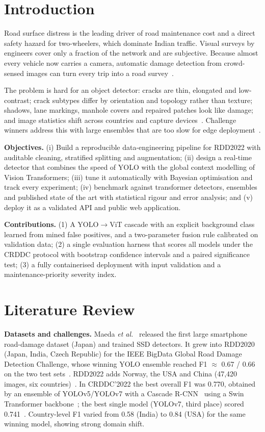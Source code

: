 \IfFileExists{IEEEtran.cls}{\documentclass[conference]{IEEEtran}}%
\begin{document}
\section{Introduction}
Road surface distress is the leading driver of road maintenance cost and a direct safety hazard for two-wheelers, which dominate Indian traffic. Visual surveys by engineers cover only a fraction of the network and are subjective. Because almost every vehicle now carries a camera, automatic damage detection from crowd-sensed images can turn every trip into a road survey~\cite{maeda2018,arya2021}.

The problem is hard for an object detector: cracks are thin, elongated and low-contrast; crack subtypes differ by orientation and topology rather than texture; shadows, lane markings, manhole covers and repaired patches look like damage; and image statistics shift across countries and capture devices~\cite{rdd2022}. Challenge winners address this with large ensembles that are too slow for edge deployment~\cite{crddc2022,grddc2020}.

\textbf{Objectives.} (i) Build a reproducible data-engineering pipeline for RDD2022 with auditable cleaning, stratified splitting and augmentation; (ii) design a real-time detector that combines the speed of YOLO with the global context modelling of Vision Transformers; (iii) tune it automatically with Bayesian optimisation and track every experiment; (iv) benchmark against transformer detectors, ensembles and published state of the art with statistical rigour and error analysis; and (v) deploy it as a validated API and public web application.

\textbf{Contributions.} (1) A YOLO$\rightarrow$ViT cascade with an explicit background class learned from mined false positives, and a two-parameter fusion rule calibrated on validation data; (2) a single evaluation harness that scores all models under the CRDDC protocol with bootstrap confidence intervals and a paired significance test; (3) a fully containerised deployment with input validation and a maintenance-priority severity index.

\section{Literature Review}
\textbf{Datasets and challenges.} Maeda \emph{et al.}~\cite{maeda2018} released the first large smartphone road-damage dataset (Japan) and trained SSD detectors. It grew into RDD2020 (Japan, India, Czech Republic) for the IEEE BigData Global Road Damage Detection Challenge, whose winning YOLO ensemble reached F1 $\approx$ 0.67 / 0.66 on the two test sets~\cite{grddc2020,arya2021}. RDD2022 adds Norway, the USA and China (47{,}420 images, six countries)~\cite{rdd2022}. In CRDDC'2022 the best overall F1 was 0.770, obtained by an ensemble of YOLOv5/YOLOv7 with a Cascade R-CNN~\cite{cascade} using a Swin Transformer backbone~\cite{swin}; the best single model (YOLOv7, third place) scored 0.741~\cite{crddc2022}. Country-level F1 varied from 0.58 (India) to 0.84 (USA) for the same winning model, showing strong domain shift.
\end{document}
